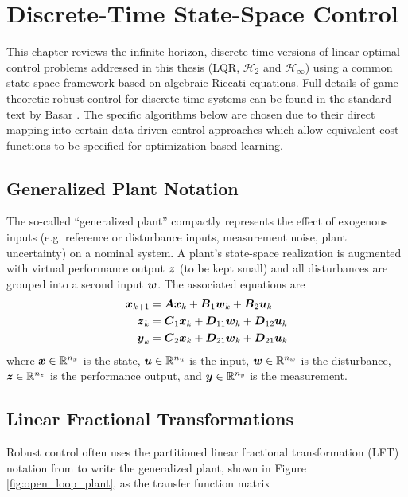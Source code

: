 \chapter{Discrete-Time State-Space Control}
\label{chap:DiscreteControl}
This chapter reviews the infinite-horizon, discrete-time versions of linear optimal control problems addressed in this thesis (LQR, $\mathcal{H}_{2}$ and $\mathcal{H}_{\infty}$) using a common state-space framework based on algebraic Riccati equations.  Full details of game-theoretic robust control for discrete-time systems can be found in the standard text by Basar \cite{bacsar2008h}.  The specific algorithms below are chosen due to their direct mapping into certain data-driven control approaches which allow equivalent cost functions to be specified for optimization-based learning.

\section{Generalized Plant Notation}
The so-called ``generalized plant'' compactly represents the effect of exogenous inputs (e.g. reference or disturbance inputs, measurement noise, plant uncertainty) on a nominal system.  A plant's state-space realization is augmented with virtual performance output $\vb*{z}$ (to be kept small) and all disturbances are grouped into a second input $\vb*{w}$.  The associated equations are
\begin{subequations}
\label{eq:state_space_equations_T0}
\begin{align}
	\vb*{x}_{k+1} &= \vb*{A}\vb*{x}_{k} + \vb*{B}_{1}\vb*{w}_{k} + \vb*{B}_{2}\vb*{u}_{k}\\
	\vb*{z}_{k} &= \vb*{C}_{1}\vb*{x}_{k} + \vb*{D}_{11}\vb*{w}_{k} + \vb*{D}_{12}\vb*{u}_{k}\\
	\vb*{y}_{k} &= \vb*{C}_{2}\vb*{x}_{k} + \vb*{D}_{21}\vb*{w}_{k} + \vb*{D}_{21}\vb*{u}_{k}
\end{align}
\end{subequations}
where $\vb*{x} \in \mathbb{R}^{n_{x}}$ is the state, $\vb*{u} \in \mathbb{R}^{n_{u}}$ is the input, $\vb*{w} \in \mathbb{R}^{n_{w}}$ is the disturbance, $\vb*{z} \in \mathbb{R}^{n_{z}}$ is the performance output, and $\vb*{y} \in \mathbb{R}^{n_{y}}$ is the measurement.

\section{Linear Fractional Transformations}
Robust control often uses the partitioned linear fractional transformation (LFT) notation from \cite{doyle1991review} to write the generalized plant, shown in Figure \ref{fig:open_loop_plant}, as the transfer function matrix

